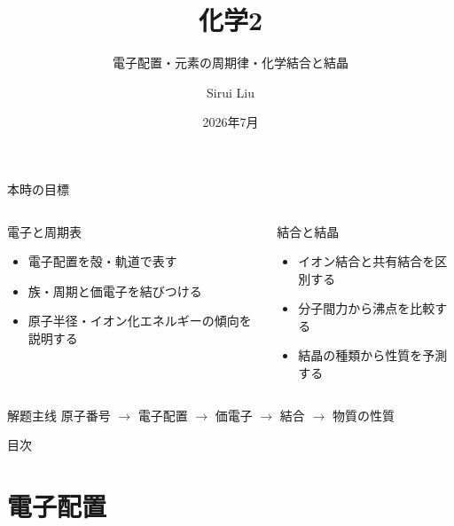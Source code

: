 \documentclass[notheorems,aspectratio=169]{beamer}
\title[EJU Chemistry]{化学2}
\subtitle{電子配置・元素の周期律・化学結合と結晶}
\author[Sirui Liu]{Sirui Liu}
\date{2026年7月}
\begin{document}
\begin{frame}\titlepage\end{frame}

\begin{frame}{本時の目標}
\begin{columns}[T,onlytextwidth]
\begin{block}{電子と周期表}
\begin{itemize}
  \item 電子配置を殻・軌道で表す
  \item 族・周期と価電子を結びつける
  \item 原子半径・イオン化エネルギーの傾向を説明する
\end{itemize}
\end{block}
\begin{exampleblock}{結合と結晶}
\begin{itemize}
  \item イオン結合と共有結合を区別する
  \item 分子間力から沸点を比較する
  \item 結晶の種類から性質を予測する
\end{itemize}
\end{exampleblock}
\end{columns}
\begin{alertblock}{解题主线}
\centering 原子番号 $\rightarrow$ 電子配置 $\rightarrow$ 価電子 $\rightarrow$ 結合 $\rightarrow$ 物質の性質
\end{alertblock}
\end{frame}

\begin{frame}{目次}\tableofcontents\end{frame}

\section{電子配置}
\end{document}
